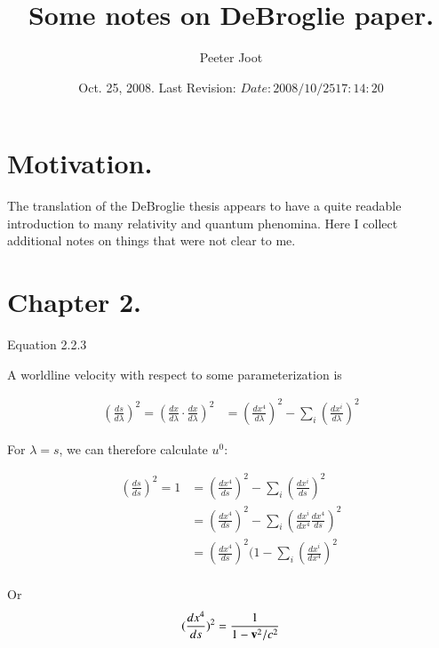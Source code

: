 \documentclass{article}      %
\title{Some notes on DeBroglie paper.} %
\author{Peeter Joot}         %
\date{ Oct. 25, 2008.  Last Revision: $Date: 2008/10/25 17:14:20 $ } %
\begin{document}

\maketitle{}

\section{ Motivation. }

The translation of the DeBroglie thesis \cite{AFkracklauerDeBroglie}
appears to have a quite readable introduction to many relativity and 
quantum phenomina.  Here I collect additional notes on things that were
not clear to me.

\section{ Chapter 2. }

Equation 2.2.3

A worldline velocity with respect to some parameterization is

\begin{align*}
(\frac{ds}{d\lambda})^2 = ( \frac{dx}{d\lambda} \cdot \frac{dx}{d\lambda} )^2
&= (\frac{dx^4}{d\lambda})^2 - \sum_i (\frac{dx^i}{d\lambda})^2
\end{align*}

For $\lambda = s$, we can therefore calculate $u^0$:

\begin{align*}
(\frac{ds}{ds})^2 = 1 
&= (\frac{dx^4}{ds})^2 - \sum_i (\frac{dx^i}{ds})^2 \\
&= (\frac{dx^4}{ds})^2 - \sum_i ( \frac{dx^i}{dx^4} \frac{dx^4}{ds} )^2 \\
&= (\frac{dx^4}{ds})^2( 1 - \sum_i ( \frac{dx^i}{dx^4} )^2 \\
\end{align*}

Or
\begin{align*}
(\frac{dx^4}{ds})^2 = \frac{1}{1 - \mathbf{v}^2/c^2 } \\
\end{align*}

\end{document}
